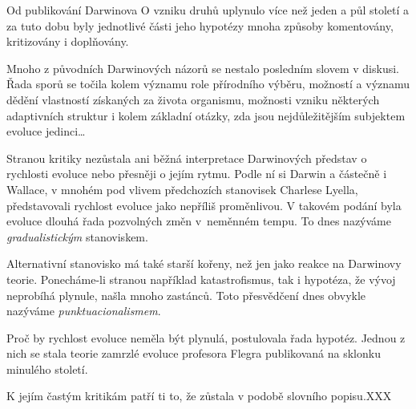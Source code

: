 Od publikování Darwinova O vzniku druhů uplynulo více než jeden a půl století a za tuto dobu byly jednotlivé části
jeho hypotézy mnoha způsoby komentovány, kritizovány i doplňovány.

Mnoho z původních Darwinových názorů se nestalo posledním slovem v diskusi. Řada sporů se točila kolem významu role
přírodního výběru, možností a významu dědění vlastností získaných za života organismu, možnosti vzniku některých
adaptivních struktur i kolem základní otázky, zda jsou nejdůležitějším subjektem evoluce jedinci\ldots

Stranou kritiky nezůstala ani běžná interpretace Darwinových představ o rychlosti evoluce nebo přesněji o jejím rytmu.
Podle ní si Darwin a částečně i Wallace, v mnohém pod vlivem předchozích stanovisek Charlese Lyella,
představovali rychlost evoluce jako nepříliš proměnlivou. V takovém podání byla evoluce dlouhá řada pozvolných změn
v~neměnném tempu. To dnes nazýváme \textit{gradualistickým} stanoviskem.

Alternativní stanovisko má také starší kořeny, než jen jako reakce na Darwinovy teorie. Ponecháme-li stranou například
katastrofismus, tak i hypotéza, že vývoj neprobíhá plynule, našla mnoho zastánců. Toto přesvědčení dnes
obvykle nazýváme \textit{punktuacionalismem}.

Proč by rychlost evoluce neměla být plynulá, postulovala řada hypotéz. Jednou z nich se stala teorie zamrzlé evoluce profesora
Flegra publikovaná na sklonku minulého století.

K jejím častým kritikám patří ti to, že zůstala v podobě slovního popisu.XXX 
